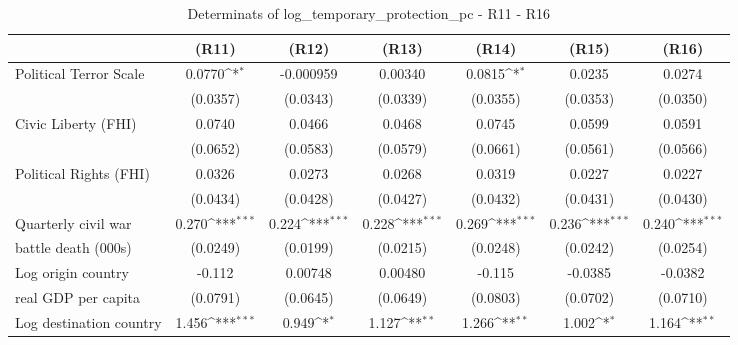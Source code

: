 \begin{table}[htbp]\centering \scriptsize
\def\sym#1{\ifmmode^{#1}\else\(^{#1}\)\fi}
\caption{Determinats of log\_temporary\_protection\_pc - R11 - R16}
\begin{tabular}{l*{6}{c}}
\hline\hline
                    &\multicolumn{1}{c}{(R11)}&\multicolumn{1}{c}{(R12)}&\multicolumn{1}{c}{(R13)}&\multicolumn{1}{c}{(R14)}&\multicolumn{1}{c}{(R15)}&\multicolumn{1}{c}{(R16)}\\
\hline
Political Terror Scale&      0.0770\sym{*}  &   -0.000959         &     0.00340         &      0.0815\sym{*}  &      0.0235         &      0.0274         \\
                    &    (0.0357)         &    (0.0343)         &    (0.0339)         &    (0.0355)         &    (0.0353)         &    (0.0350)         \\
[0,5em]
Civic Liberty (FHI) &      0.0740         &      0.0466         &      0.0468         &      0.0745         &      0.0599         &      0.0591         \\
                    &    (0.0652)         &    (0.0583)         &    (0.0579)         &    (0.0661)         &    (0.0561)         &    (0.0566)         \\
[0,5em]
Political Rights (FHI)&      0.0326         &      0.0273         &      0.0268         &      0.0319         &      0.0227         &      0.0227         \\
                    &    (0.0434)         &    (0.0428)         &    (0.0427)         &    (0.0432)         &    (0.0431)         &    (0.0430)         \\
[0,5em]
Quarterly civil war&       0.270\sym{***}&       0.224\sym{***}&       0.228\sym{***}&       0.269\sym{***}&       0.236\sym{***}&       0.240\sym{***}\\
 battle death (000s)                    &    (0.0249)         &    (0.0199)         &    (0.0215)         &    (0.0248)         &    (0.0242)         &    (0.0254)         \\
[0,5em]
Log origin country&      -0.112         &     0.00748         &     0.00480         &      -0.115         &     -0.0385         &     -0.0382         \\
 real GDP per capita                    &    (0.0791)         &    (0.0645)         &    (0.0649)         &    (0.0803)         &    (0.0702)         &    (0.0710)         \\
[0,5em]
Log destination country&       1.456\sym{***}&       0.949\sym{*}  &       1.127\sym{**} &       1.266\sym{**} &       1.002\sym{*}  &       1.164\sym{**} \\

\end{tabular}
\end{table}
